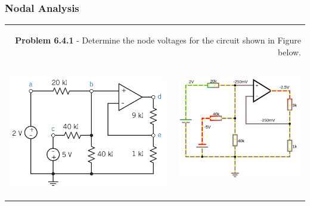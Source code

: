 \documentclass[aspectratio=169]{beamer}
\begin{document}
\begin{frame}[fragile]
\frametitle{Nodal Analysis}
\begin{tabular}{r}


	
	
	\begin{columns}
		\begin{column}{1\textwidth}  %
		 \textbf{Problem 6.4.1} - Determine the node voltages for the circuit shown in Figure below. \newline
		\end{column}
  \end{columns}\\

    \begin{columns}
		\begin{column}{.5\textwidth}  %
		
    			\includegraphics[height=.6\textwidth]{figura13.png}
    			
		\end{column}
		\begin{column}{.5\textwidth}  %
		
    			
    			\includegraphics[height=.6\textwidth]{figura31.png}
    			

\end{column}
\end{columns}
\end{tabular}
\end{frame}
\end{document}
